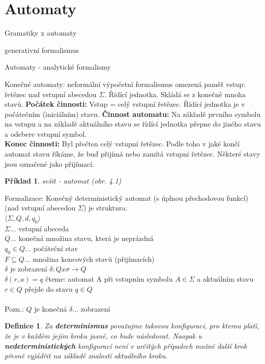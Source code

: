 \documentclass[10pt, a4paper, titlepage]{article}
\theoremstyle{note}
\newtheorem{definice}{\textbf{Definice}}
\newtheorem{priklad}{\textbf{Příklad}}
\begin{document}
\section{Automaty}
Gramatiky x automaty

generativní formalismus

Automaty - analytické formalismy

Konečné automaty: neformální
výpočetní formalismus 
omezená paměť
vstup: řetězec nad vstupní abecedou $\Sigma.$ Řídící jednotka. Skládá se z konečně mnoha stavů.
\textbf{Počátek činnosti:} Vstup = celý vstupní řetězec. Řídící jednotka je v počátečním (iniciálním) stavu.
\textbf{Činnost automatu:} Na základě prvního symbolu na vstupu a na základě aktuálního stavu se řídící jednotka 
přepne do jiného stavu a odebere vstupní symbol.\\
\textbf{Konec činnosti:} Byl přečten celý vstupní řetězec. Podle toho v jaké končí automat stavu říkáme, 
že buď přijímá nebo zamítá vstupní řetězec. Některé stavy jsou označené jako přijímací.

\begin{priklad}
sešit - automat (obr. 4.1)
\end{priklad}

Formalizace:
Konečný deterministický automat (s úplnou přechodovou funkcí) (nad vstupní abecedou $\Sigma$) je struktura: \\
$\langle \Sigma, Q, d, q_{0} \rangle$ \\
$\Sigma \ldots$ vstupní abeceda \\
$Q \ldots$ konečná množina stavu, která je neprázdná \\
$q_{0} \in Q \ldots$ počáteční stav \\
$F \subseteq Q \ldots$ množina koncových stavů (přijímacích) \\
$\delta$ je zobrazení $\delta: Q x \sigma \rightarrow Q$ \\
$\delta(r,a) = q$ čteme: automat A při vstupním symbolu $A \in \Sigma$ a aktuálním stavu $r \in Q$
 přejde do stavu $q \in Q$
\\ \\
Pozn.: $Q$ je konečná
$\delta \ldots$ zobrazení



\begin{definice}
Za \textbf{determinismus} považujme takovou konfiguraci, pro kterou platí, že je v každém jejím kroku jasné, co bude následovat.
Naopak u \textbf{nedeterministických} konfigurací není v určitých případech možné další krok přesně vyjádřit na základě znalostí aktuálního kroku.
\end{definice}
\end{document}
